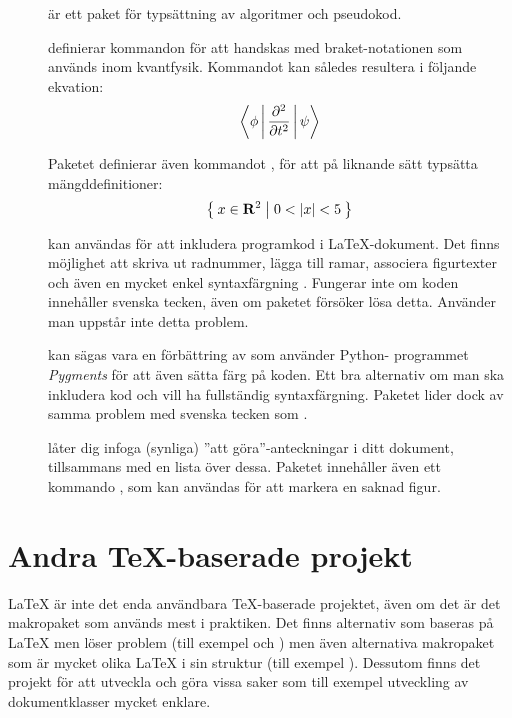 \documentclass[10pt,../../a4.tex]{subfiles}
\begin{document}
\begin{description}
	\item[]
	är ett paket för typsättning av algoritmer och pseudokod.
	
	\item[{}]\label{pack:braket}
	definierar kommandon för att handskas med braket-notationen som
	används inom kvantfysik. Kommandot  kan således resultera
	i följande ekvation:
	\begin{equation*}
		\Braket{\phi|\dfrac{\partial^2}{\partial t^2}|\psi}
	\end{equation*}
	
	Paketet definierar även kommandot , för att på liknande
	sätt typsätta mängddefinitioner:
	\begin{equation*}
		\Set{x\in\mathbf{R}^2|0<{|x|}<5}
	\end{equation*}
	
	\item[]
	kan användas för att inkludera programkod i \LaTeX-dokument. Det finns
	möjlighet att skriva ut radnummer, lägga till ramar, associera
	figurtexter och även en mycket enkel syntaxfärgning . Fungerar inte om koden innehåller svenska tecken, även
	om paketet \emph{} försöker lösa detta. Använder 
	man \XeTeX{} uppstår inte detta problem.
	
	\item[{}]
	kan sägas vara en förbättring av  som använder Python-%
	programmet \emph{Pygments} för att även sätta färg på koden. Ett bra
	alternativ om man ska inkludera kod och vill ha fullständig
	syntaxfärgning. Paketet lider dock av samma problem med svenska tecken
	som .
	
	\item[{}]
	låter dig infoga (synliga) ”att göra”-anteckningar i ditt dokument, tillsammans
	med en lista över dessa. Paketet innehåller även ett kommando ,
	som kan användas för att markera en saknad figur.
\end{description}

\section{Andra \TeX-baserade projekt}
\LaTeX{} är inte det enda användbara \TeX-baserade projektet, även om det
är det makropaket som används mest i praktiken. Det finns alternativ
som baseras på \LaTeX{} men löser problem (till exempel \XeTeX{} och
) men även alternativa makropaket som är mycket olika
\LaTeX{} i sin struktur (till exempel ). Dessutom finns
det projekt för att utveckla \LaTeXe{} och göra vissa saker som till 
exempel utveckling av dokumentklasser mycket enklare.
\end{document}
